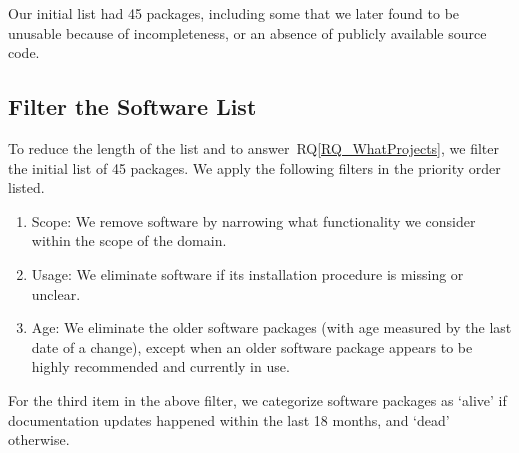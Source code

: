 \documentclass[final, 3p, times, authoryear]{elsarticle}
\newcommand{\rqref}[1]{RQ\ref{#1}}
\begin{document}
\noindent Our initial list had 45 packages, including some that we later found
to be unusable because of incompleteness, or an absence of publicly available
source code.

\subsection{Filter the Software List} \label{filtersoftware}

To reduce the length of the list and to answer~\rqref{RQ_WhatProjects}, we
filter the initial list of 45 packages. We apply the following filters in the
priority order listed. 

\begin{enumerate}
	\item Scope: We remove software by narrowing what functionality we
    consider within the scope of the domain.
	\item Usage: We eliminate software if its installation procedure is
	missing or unclear.
	\item Age: We eliminate the older software packages (with age measured by
	the last date of a change), except when an older software package appears to
	be highly recommended and currently in use. 
\end{enumerate}

For the third item in the above filter, we categorize software packages as
`alive' if documentation updates happened within the last 18 months, and `dead'
otherwise. 
\end{document}
